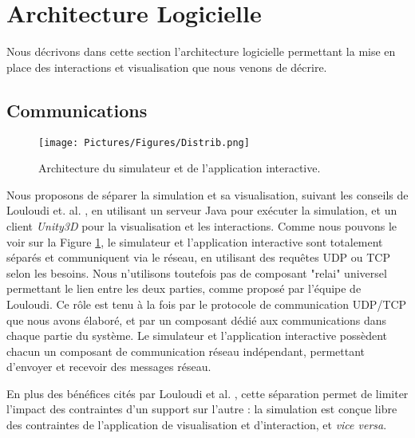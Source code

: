 	\section{Architecture Logicielle}
	
	Nous décrivons dans cette section l'architecture logicielle permettant la mise en place des interactions et visualisation que nous venons de décrire.
	
	\subsection{Communications}

	\begin{figure}
	\centering
	\texttt{[image: Pictures/Figures/Distrib.png]}
	\caption{Architecture du simulateur et de l'application interactive.}
	\label{archi}
	\end{figure}
	
	
	Nous proposons de séparer la simulation et sa visualisation, suivant les conseils de Louloudi et. al. \cite{louloudi_new_2012}, en utilisant un serveur Java pour exécuter la simulation, et un client \textit{Unity3D} pour la visualisation et les interactions. Comme nous pouvons le voir sur la Figure \ref{archi}, le simulateur et l'application interactive sont totalement séparés et communiquent via le réseau, en utilisant des requêtes UDP ou TCP selon les besoins. Nous n'utilisons toutefois pas de composant "relai" universel permettant le lien entre les deux parties, comme proposé par l'équipe de Louloudi. Ce rôle est tenu à la fois par le protocole de communication UDP/TCP que nous avons élaboré, et par un composant dédié aux communications dans chaque partie du système. Le simulateur et l'application interactive possèdent chacun un composant de communication réseau indépendant, permettant d'envoyer et recevoir des messages réseau.
	
	En plus des bénéfices cités par Louloudi et al. \cite{louloudi_new_2012}, cette séparation permet de limiter l'impact des contraintes d'un support sur l'autre : la simulation est conçue libre des contraintes de l'application de visualisation et d'interaction, et \textit{vice versa}. 	
	
